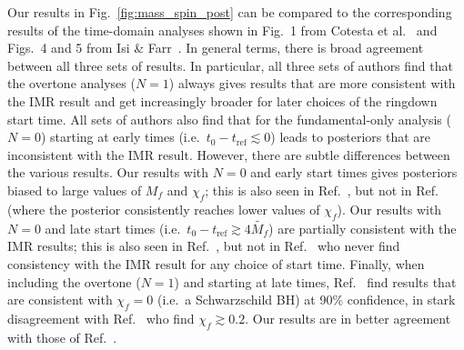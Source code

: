 Our results in Fig.~\ref{fig:mass_spin_post} can be compared to the corresponding results of the time-domain analyses shown in Fig.~1 from Cotesta et al.~\cite{Cotesta:2022pci} and Figs.~4 and 5 from Isi \& Farr~\cite{Isi:2022mhy}.
In general terms, there is broad agreement between all three sets of results. 
In particular, all three sets of authors find that the overtone analyses ($N=1$) always gives results that are more consistent with the IMR result and get increasingly broader for later choices of the ringdown start time.
All sets of authors also find that for the fundamental-only analysis ($N=0$) starting at early times (i.e.\ $t_0  - t_\mathrm{ref}\lesssim 0$) leads to posteriors that are inconsistent with the IMR result.
However, there are subtle differences between the various results.
Our results with $N=0$ and early start times gives posteriors biased to large values of $M_f$ and $\chi_f$; this is also seen in Ref.~\cite{Isi:2022mhy}, but not in Ref.~\cite{Cotesta:2022pci} (where the posterior consistently reaches lower values of $\chi_f$).
Our results with $N=0$ and late start times (i.e.\ $t_0 - t_\mathrm{ref}\gtrsim 4\tilde{M_f}$) are partially consistent with the IMR results; this is also seen in Ref.~\cite{Cotesta:2022pci}, but not in Ref.~\cite{Isi:2022mhy} who never find consistency with the IMR result for any choice of start time.
Finally, when including the overtone ($N=1$) and starting at late times, Ref.~\cite{Cotesta:2022pci} find results that are consistent with $\chi_f=0$ (i.e.\ a Schwarzschild BH) at 90\% confidence, in stark disagreement with Ref.~\cite{Isi:2022mhy} who find $\chi_f\gtrsim 0.2$. 
Our results are in better agreement with those of Ref.~\cite{Isi:2022mhy}.

